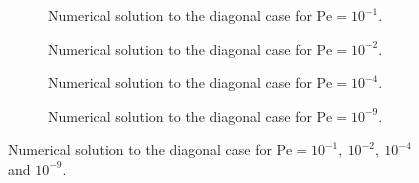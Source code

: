 \begin{figure}[h]
	\centering
	\begin{subfigure}{.5\textwidth}
		\centering
		\vspace{-0.75cm}
		
		\vspace{-0.50cm}
		\captionsetup{width=0.8\textwidth}
		\caption{Numerical solution to the diagonal case for $\mathrm{Pe} = 10^{-1}$.}
		\label{fig:diagonal_N200_Pe1.0e-01}
	\end{subfigure}%
	\begin{subfigure}{.5\textwidth}
		\centering
		\vspace{-0.75cm}
		
		\vspace{-0.50cm}
		\captionsetup{width=0.8\textwidth}
		\caption{Numerical solution to the diagonal case for $\mathrm{Pe} = 10^{-2}$.}
		\label{fig:diagonal_N200_Pe1.0e-02}
	\end{subfigure}
	\begin{subfigure}{.5\textwidth}
		\centering
		\vspace{-0.25cm}
		
		\vspace{-0.50cm}
		\captionsetup{width=0.8\textwidth}
		\caption{Numerical solution to the diagonal case for $\mathrm{Pe} = 10^{-4}$.}
		\label{fig:diagonal_N200_Pe1.0e-04}
	\end{subfigure}%
	\begin{subfigure}{.5\textwidth}
		\centering
		\vspace{-0.25cm}
		
		\vspace{-0.50cm}
		\captionsetup{width=0.8\textwidth}
		\caption{Numerical solution to the diagonal case for $\mathrm{Pe} = 10^{-9}$.}
		\label{fig:diagonal_N200_Pe1.0e-09}
	\end{subfigure}
	\caption{Numerical solution to the diagonal case for $\mathrm{Pe} = 10^{-1}, \ 10^{-2}, \ 10^{-4}$ and $10^{-9}$.}
	\label{fig:diagonal_N200_Pe_less_than_1}
\end{figure}